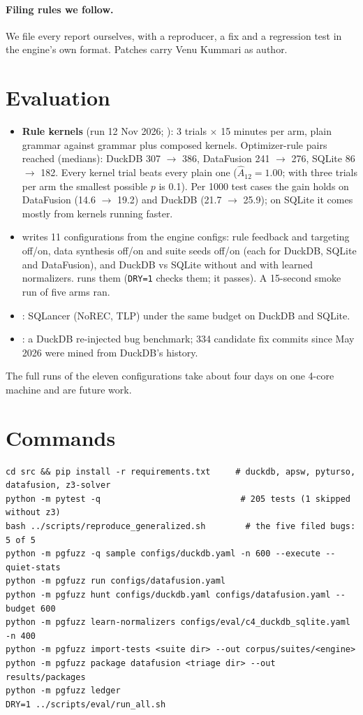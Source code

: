 \paragraph{Filing rules we follow.} We file every report ourselves, with a
reproducer, a fix and a regression test in the engine's own format. Patches carry
Venu Kummari as author.

\section{Evaluation}

\begin{itemize}
  \item \textbf{Rule kernels} (run 12 Nov 2026; ):
    3 trials $\times$ 15 minutes per arm, plain grammar against grammar plus composed
    kernels. Optimizer-rule pairs reached (medians): DuckDB 307 $\to$ 386, DataFusion
    241 $\to$ 276, SQLite 86 $\to$ 182. Every kernel trial beats every plain one
    ($\hat{A}_{12}=1.00$; with three trials per arm the smallest possible $p$ is 0.1).
    Per 1000 test cases the gain holds on DataFusion (14.6 $\to$ 19.2) and DuckDB
    (21.7 $\to$ 25.9); on SQLite it comes mostly from kernels running faster.
  \item {} writes 11 configurations from the
    engine configs: rule feedback and targeting off/on, data synthesis off/on and
    suite seeds off/on (each for DuckDB, SQLite and DataFusion), and DuckDB vs
    SQLite without and with learned normalizers. 
    runs them (\texttt{DRY=1} checks them; it passes). A 15-second smoke run of
    five arms ran.
  \item {}: SQLancer (NoREC, TLP) under the
    same budget on DuckDB and SQLite.
  \item {}: a DuckDB re-injected bug benchmark; 334 candidate
    fix commits since May 2026 were mined from DuckDB's history.
\end{itemize}
The full runs of the eleven configurations take about four days on one 4-core
machine and are future work.

\section{Commands}
\begin{lstlisting}
cd src && pip install -r requirements.txt     # duckdb, apsw, pyturso, datafusion, z3-solver
python -m pytest -q                            # 205 tests (1 skipped without z3)
bash ../scripts/reproduce_generalized.sh        # the five filed bugs: 5 of 5
python -m pgfuzz -q sample configs/duckdb.yaml -n 600 --execute --quiet-stats
python -m pgfuzz run configs/datafusion.yaml
python -m pgfuzz hunt configs/duckdb.yaml configs/datafusion.yaml --budget 600
python -m pgfuzz learn-normalizers configs/eval/c4_duckdb_sqlite.yaml -n 400
python -m pgfuzz import-tests <suite dir> --out corpus/suites/<engine>
python -m pgfuzz package datafusion <triage dir> --out results/packages
python -m pgfuzz ledger
DRY=1 ../scripts/eval/run_all.sh
\end{lstlisting}
